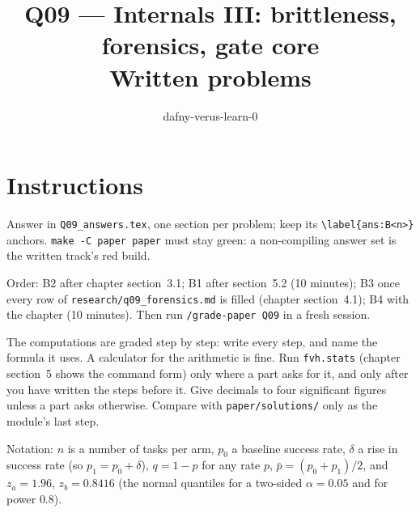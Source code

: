 \documentclass[11pt]{article}
\title{Q09 --- Internals III: brittleness, forensics, gate core \\ \large Written problems}
\author{dafny-verus-learn-0}
\date{}
\begin{document}
\sloppy
\maketitle

\section*{Instructions}
Answer in \texttt{Q09\_answers.tex}, one section per problem; keep its
\verb+\label{ans:B<n>}+ anchors. \texttt{make -C paper paper} must stay green:
a non-compiling answer set is the written track's red build.

Order: B2 after chapter section~3.1; B1 after section~5.2 (10 minutes); B3 once
every row of \texttt{research/q09\_forensics.md} is filled (chapter
section~4.1); B4 with the chapter (10 minutes). Then run \texttt{/grade-paper
Q09} in a fresh session.

The computations are graded step by step: write every step, and name the
formula it uses. A calculator for the arithmetic is fine. Run
\texttt{fvh.stats} (chapter section~5 shows the command form) only where a part
asks for it, and only after you have written the steps before it. Give
decimals to four significant figures unless a part asks otherwise. Compare with
\texttt{paper/solutions/} only as the module's last step.

Notation: $n$ is a number of tasks per arm, $p_0$ a baseline success rate,
$\delta$ a rise in success rate (so $p_1 = p_0 + \delta$), $q = 1 - p$ for any
rate $p$, $\bar p = (p_0 + p_1)/2$, and $z_a = 1.96$, $z_b = 0.8416$ (the normal
quantiles for a two-sided $\alpha = 0.05$ and for power $0.8$).
\end{document}
